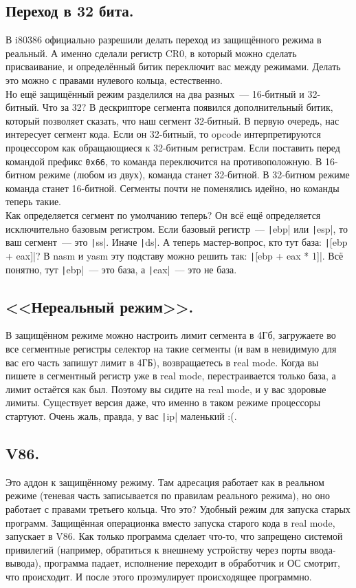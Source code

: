 \documentclass{article}
\begin{document}
    \subsection{Переход в 32 бита.}
    В i80386 официально разрешили делать переход из защищённого режима в реальный. А именно сделали регистр CR0, в который можно сделать присваивание, и определённый битик переключит вас между режимами. Делать это можно с правами нулевого кольца, естественно.\\
    Но ещё защищённый режим разделился на два разных~--- 16-битный и 32-битный. Что за 32? В дескрипторе сегмента появился дополнительный битик, который позволяет сказать, что наш сегмент 32-битный. В первую очередь, нас интересует сегмент кода. Если он 32-битный, то opcode интерпретируются процессором как обращающиеся к 32-битным регистрам. Если поставить перед командой префикс \Verb|0x66|, то команда переключится на противоположную. В 16-битном режиме (любом из двух), команда станет 32-битной. В 32-битном режиме команда станет 16-битной. Сегменты почти не поменялись идейно, но команды теперь такие.\\
    Как определяется сегмент по умолчанию теперь? Он всё ещё определяется исключительно базовым регистром. Если базовый регистр~--- \texttt|ebp| или \texttt|esp|, то ваш сегмент~--- это \texttt|ss|. Иначе \texttt|ds|. А теперь мастер-вопрос, кто тут база: \texttt|[ebp + eax]|? В nasm и yasm эту подставу можно решить так: \texttt|[ebp + eax * 1]|. Всё понятно, тут \texttt|ebp|~--- это база, а \texttt|eax|~--- это не база.
    \subsection{<<Нереальный режим>>.}
    В защищённом режиме можно настроить лимит сегмента в 4Гб, загружаете во все сегментные регистры селектор на такие сегменты (и вам в невидимую для вас его часть запишут лимит в 4ГБ), возвращаетесь в real mode. Когда вы пишете в сегментный регистр уже в real mode, перестраивается только база, а лимит остаётся как был. Поэтому вы сидите на real mode, и у вас здоровые лимиты. Существует версия даже, что именно в таком режиме процессоры стартуют. Очень жаль, правда, у вас \texttt|ip| маленький :(.
    \subsection{V86.}
    Это аддон к защищённому режиму. Там адресация работает как в реальном режиме (теневая часть записывается по правилам реального режима), но оно работает с правами третьего кольца. Что это? Удобный режим для запуска старых программ. Защищённая операционка вместо запуска старого кода в real mode, запускает в V86. Как только программа сделает что-то, что запрещено системой привилегий (например, обратиться к внешнему устройству через порты ввода-вывода), программа падает, исполнение переходит в обработчик и ОС смотрит, что происходит. И после этого проэмулирует происходящее программно.
\end{document}
